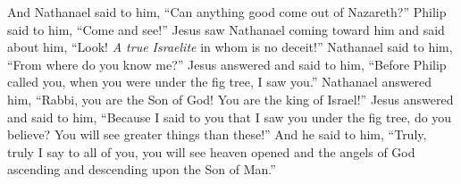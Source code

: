 \begin{biblechapter}
\verse And Nathanael said to him, “Can anything good come out of Nazareth?” Philip said to him, “Come and see!”
\verse Jesus saw Nathanael coming toward him and said about him, “Look! \textit{A true Israelite} in whom is no deceit!”
\verse Nathanael said to him, “From where do you know me?” Jesus answered and said to him, “Before Philip called you, when you were under the fig tree, I saw you.”
\verse Nathanael answered him, “Rabbi, you are the Son of God! You are the king of Israel!”
\verse Jesus answered and said to him, “Because I said to you that I saw you under the fig tree, do you believe? You will see greater things than these!”
\verse And he said to him, “Truly, truly I say to all of you, you will see heaven opened and the angels of God ascending and descending upon the Son of Man.”
\end{biblechapter}

